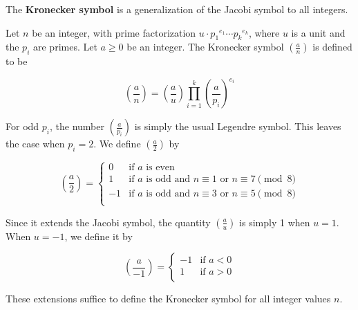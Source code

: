 \documentclass[12pt]{article}
\begin{document}
The {\bf Kronecker symbol} is a generalization of the Jacobi symbol to all integers.

Let $n$ be an integer, with prime factorization $u \cdot {p_1}^{e_1} \cdots {p_k}^{e_k}$, where $u$ is a unit and the $p_i$ are primes.  Let $a \geq 0$ be an integer.  The Kronecker symbol  $\left(\frac{a}{n}\right)$ is defined to be

\[ \left(\frac{a}{n}\right) =  \left(\frac{a}{u}\right) \prod_{i=1}^k \left(\frac{a}{p_i}\right)^{e_i} \]

For odd $p_i$, the number $\left(\frac{a}{p_i}\right)$ is simply the usual Legendre symbol.  This leaves the case when $p_i=2$.  We define $\left(\frac{a}{2}\right)$ by

\[ \left(\frac{a}{2}\right) = \begin{cases}
0 &\text{if $a$ is even}\\
1 & \text{if $a$ is odd and $n \equiv 1$ or $n \equiv  7 \pmod{8}$} \\
-1 & \text{if $a$ is odd and $n \equiv 3$ or $n \equiv 5 \pmod{8}$} \\
\end{cases} \]

Since it extends the Jacobi symbol, the quantity $\left(\frac{a}{u}\right)$ is simply 1 when $u=1$.  When $u=-1$, we define it by

\[ \left(\frac{a}{-1}\right) = \begin{cases}
-1 & \text{if $a < 0$} \\
1 & \text{if $a > 0$} \\
\end{cases} \]

These extensions suffice to define the Kronecker symbol for all integer values $n$.
\end{document}
